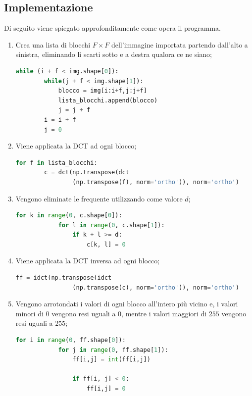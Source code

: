 \documentclass[preprint,12pt]{elsarticle}
\begin{document}
\begin{description}
\subsection{Implementazione}
Di seguito viene spiegato approfonditamente come opera il programma.
\begin{enumerate}
\item Crea una lista di blocchi $F \times F$ dell'immagine importata partendo dall'alto a sinistra, eliminando li scarti sotto e a destra qualora ce ne siano;

\begin{lstlisting}[language=Python]
while (i + f < img.shape[0]):
        while(j + f < img.shape[1]):
            blocco = img[i:i+f,j:j+f]
            lista_blocchi.append(blocco)
            j = j + f
        i = i + f
        j = 0
\end{lstlisting}

\item Viene applicata la DCT ad ogni blocco;
\begin{lstlisting}[language=Python]
 for f in lista_blocchi:
        c = dct(np.transpose(dct
        		(np.transpose(f), norm='ortho')), norm='ortho')
\end{lstlisting}

\item Vengono eliminate le frequente utilizzando come valore $d$;
\begin{lstlisting}[language=Python]
for k in range(0, c.shape[0]):
            for l in range(0, c.shape[1]):
                if k + l >= d:
                    c[k, l] = 0
\end{lstlisting}

\item Viene applicata la DCT inversa ad ogni blocco;
\begin{lstlisting}[language=Python]
ff = idct(np.transpose(idct
				(np.transpose(c), norm='ortho')), norm='ortho')
\end{lstlisting}

\item Vengono arrotondati i valori di ogni blocco all'intero più vicino e, i valori minori di $0$ vengono resi uguali a $0$, mentre i valori maggiori di $255$ vengono resi uguali a $255$;
\begin{lstlisting}[language=Python]
for i in range(0, ff.shape[0]):
            for j in range(0, ff.shape[1]):
                ff[i,j] = int(ff[i,j])

                if ff[i, j] < 0:
                    ff[i,j] = 0
                    

\end{lstlisting}
\end{enumerate}
\end{description}
\end{document}
